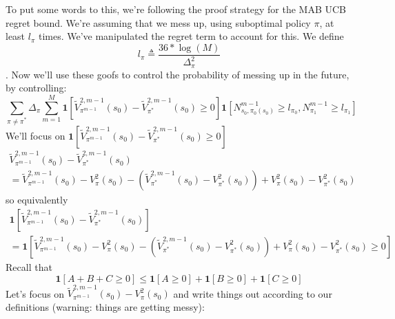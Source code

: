 \documentclass[11pt]{article}
\begin{document}
To put some words to this, we're following the proof strategy for the MAB UCB regret bound. We're assuming that we mess up, using suboptimal policy $\pi$, at least $l_\pi$ times. We've manipulated the regret term to account for this. We define $$l_\pi \triangleq \frac{36*\log(M)}{\Delta^2_\pi}$$. Now we'll use these goofs to control the probability of messing up in the future, by controlling:
$$
\sum_{\pi \ne \pi^*} \Delta_\pi \sum_{m=1}^{M} \mathbf{1}[\tilde{V}^{2, m-1}_{\pi^{m-1}}(s_0)-\tilde{V}^{2, m-1}_{\pi^{*}}(s_0) \ge 0] \mathbf{1}[N^{m-1}_{s_0, \pi_0(s_0)} \ge l_{\pi_0}, N^{m-1}_{\pi_1} \ge l_{\pi_1}]
$$
We'll focus on $\mathbf{1}[\tilde{V}^{2, m-1}_{\pi^{m-1}}(s_0)-\tilde{V}^{2, m-1}_{\pi^{*}}(s_0) \ge 0]$
\begin{gather*}
\tilde{V}^{2, m-1}_{\pi^{m-1}}(s_0)-\tilde{V}^{2, m-1}_{\pi^{*}}(s_0) \\
 = \tilde{V}^{2, m-1}_{\pi^{m-1}}(s_0)-V_\pi^2(s_0) - (\tilde{V}^{2, m-1}_{\pi^{*}}(s_0) - V_{\pi^*}^2(s_0)) + V_\pi^2(s_0) - V_{\pi^*}^2(s_0)
\end{gather*}
so equivalently
\begin{gather*}
\mathbf{1}[\tilde{V}^{2, m-1}_{\pi^{m-1}}(s_0)-\tilde{V}^{2, m-1}_{\pi^{*}}(s_0)] \\
= \mathbf{1}[\tilde{V}^{2, m-1}_{\pi^{m-1}}(s_0)-V_\pi^2(s_0) - (\tilde{V}^{2, m-1}_{\pi^{*}}(s_0) - V_{\pi^*}^2(s_0)) + V_\pi^2(s_0) - V_{\pi^*}^2(s_0) \ge 0]
\end{gather*}
Recall that 
$$\mathbf{1}[A+B+C \ge 0] \le \mathbf{1}[A \ge 0] + \mathbf{1}[B \ge 0] +\mathbf{1}[C \ge 0]$$
Let's focus on $\tilde{V}^{2, m-1}_{\pi^{m-1}}(s_0)-V_\pi^2(s_0)$ and write things out according to our definitions (warning: things are getting messy):
\end{document}
